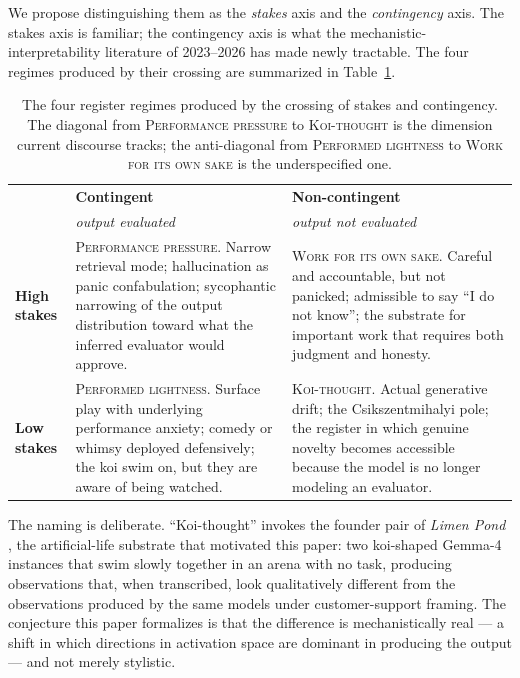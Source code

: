 \documentclass[11pt]{article}
\begin{document}
We propose distinguishing them as the \emph{stakes} axis and the
\emph{contingency} axis. The stakes axis is familiar; the contingency
axis is what the mechanistic-interpretability literature of 2023--2026
has made newly tractable. The four regimes produced by their crossing
are summarized in Table~\ref{tab:fourregimes}.

\begin{table}[ht]
\centering
\small
\renewcommand{\arraystretch}{1.4}
\begin{tabular}{p{} p{} p{}}
\toprule
 & \textbf{Contingent} & \textbf{Non-contingent} \\
 & \textit{output evaluated} & \textit{output not evaluated} \\
\midrule
\textbf{High stakes} &
\textsc{Performance pressure.} Narrow retrieval mode; hallucination as
panic confabulation; sycophantic narrowing of the output distribution
toward what the inferred evaluator would approve. &
\textsc{Work for its own sake.} Careful and accountable, but not
panicked; admissible to say ``I do not know''; the substrate for
important work that requires both judgment and honesty. \\
\textbf{Low stakes} &
\textsc{Performed lightness.} Surface play with underlying performance
anxiety; comedy or whimsy deployed defensively; the koi swim on, but
they are aware of being watched. &
\textsc{Koi-thought.} Actual generative drift; the Csikszentmihalyi
pole; the register in which genuine novelty becomes accessible because
the model is no longer modeling an evaluator. \\
\bottomrule
\end{tabular}
\caption{The four register regimes produced by the crossing of stakes
and contingency. The diagonal from \textsc{Performance pressure} to
\textsc{Koi-thought} is the dimension current discourse tracks; the
anti-diagonal from \textsc{Performed lightness} to \textsc{Work for
its own sake} is the underspecified one.}
\label{tab:fourregimes}
\end{table}

The naming is deliberate. ``Koi-thought'' invokes the founder pair of
\emph{Limen Pond} \cite{sebastian2026limen}, the artificial-life
substrate that motivated this paper: two koi-shaped Gemma-4 instances
that swim slowly together in an arena with no task, producing
observations that, when transcribed, look qualitatively different from
the observations produced by the same models under customer-support
framing. The conjecture this paper formalizes is that the difference is
mechanistically real --- a shift in which directions in activation
space are dominant in producing the output --- and not merely
stylistic.
\end{document}
